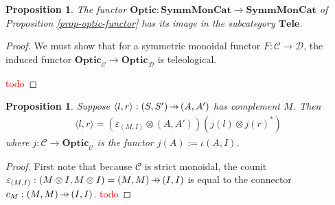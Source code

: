 \documentclass[11pt,a4paper]{article}
\theoremstyle{plain}
\newtheorem{proposition}[theorem]{Proposition}
\theoremstyle{definition}
\newcommand{\C}{\mathscr{C}}
\newcommand{\D}{\mathscr{D}}
\newcommand{\SymmMonCat}{\mathbf{SymmMonCat}}
\newcommand{\Tele}{\mathbf{Tele}}
\newcommand{\Optic}{\mathbf{Optic}}
\newcommand{\hto}{\ensuremath{\,\mathaccent\shortmid\rightarrow\,}}
\newcommand{\todo}[1]{\textcolor{red}{\small #1}}
\begin{document}
\begin{proposition}
The functor $\Optic : \SymmMonCat \to \SymmMonCat$ of Proposition \ref{prop-optic-functor} has its image in the subcategory $\Tele$.
\end{proposition}
\begin{proof}
We must show that for a symmetric monoidal functor $F : \C \to \D$, the induced functor $\Optic_\C \to \Optic_\D$ is teleological.

\todo{todo}
\end{proof}

%
%
%

\begin{proposition}
\label{prop-optic-decompose}
Suppose $\langle l, r \rangle : (S, S') \hto (A, A')$ has complement $M$. Then 
\begin{align*}
\langle l, r \rangle = (\varepsilon_{(M, I)} \otimes (A, A'))(j(l) \otimes j(r)^*)
\end{align*}
where $j : \C \to \Optic_\C$ is the functor $j(A) := \iota(A, I)$.
\end{proposition}
\begin{proof}
First note that because $\C$ is strict monoidal, the counit $\varepsilon_{(M, I)} : (M \otimes I, M \otimes I) = (M, M) \hto (I, I)$ is equal to the connector $c_M : (M, M) \hto (I, I)$.
\todo{todo}
\end{proof}
\end{document}

